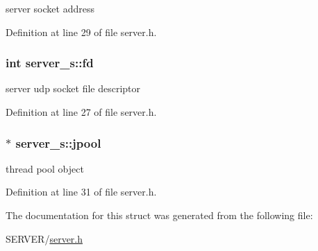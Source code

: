 server socket address 



Definition at line 29 of file server.\-h.

\hypertarget{structserver__s_a6129acbc6b313f77efeb488754f559ec}{
\subsubsection[{fd}]{\setlength{\rightskip}{0pt plus 5cm}int server\-\_\-s\-::fd}}\label{structserver__s_a6129acbc6b313f77efeb488754f559ec}


server udp socket file descriptor 



Definition at line 27 of file server.\-h.

\hypertarget{structserver__s_ac45d9f57c1cf8b4841843284d319072b}{
\subsubsection[{jpool}]{$\ast$ server\-\_\-s\-::jpool}}\label{structserver__s_ac45d9f57c1cf8b4841843284d319072b}


thread pool object 



Definition at line 31 of file server.\-h.



The documentation for this struct was generated from the following file\-:\begin{DoxyCompactItemize}
\item 
S\-E\-R\-V\-E\-R/\hyperlink{server_8h}{server.\-h}\end{DoxyCompactItemize}
